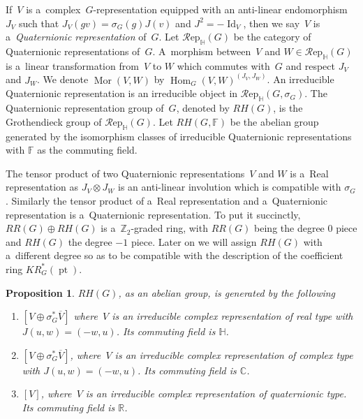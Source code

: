 \documentclass[pdftex]{sigma}
\numberwithin{equation}{section}
\newtheorem{Proposition}[Theorem]{Proposition}
{\theoremstyle{definition}
\newtheorem{Definition}[Theorem]{Definition}
\newtheorem{Example}[Theorem]{Example}
\newtheorem{Remark}[Theorem]{Remark}
}
\DeclareMathOperator{\pt}{pt}
\DeclareMathOperator{\Mor}{Mor}
\DeclareMathOperator{\Hom}{Hom}
\DeclareMathOperator{\Id}{Id}
\begin{document}
\begin{Definition}
If~$V$ is a~complex~$G$-representation equipped with an anti-linear endomor\-phism~$J_V$ such that $J_V(gv)=
\sigma_G(g)J(v)$ and $J^2=-\Id
_V$, then we say~$V$ is a~\emph{Quaternionic representation} of~$G$.
Let $\mathcal{R}\text{ep}_\mathbb{H}(G)$ be the category of Quaternionic representations of~$G$.
A~morphism between~$V$ and $W\in \mathcal{R}\text{ep}_\mathbb{H}(G)$ is a~linear transformation from~$V$ to $W$ which commutes
with~$G$ and respect $J_V$ and $J_W$.
We denote $\Mor(V, W)$ by $\Hom_G(V, W)^{(J_V, J_W)}$.
An irreducible Quaternionic representation is an irreducible object in $\mathcal{R}\text{ep}_\mathbb{H}(G,
\sigma_G)$.
The Quaternionic representation group of~$G$, denoted by $RH(G)$, is the Grothendieck group of $\mathcal{R}\text{ep}_\mathbb{H}(G)$.
Let $RH(G, \mathbb{F})$ be the abelian group generated by the isomorphism classes of irreducible Quaternionic
representations with $\mathbb{F}$ as the commuting f\/ield.
\end{Definition}
\begin{Remark}
The tensor product of two Quaternionic representations~$V$ and $W$ is a~Real representation as $J_V\otimes J_W$ is an
anti-linear involution which is compatible with $\sigma_G$.
Similarly the tensor product of a~Real representation and a~Quaternionic representation is a~Quaternionic
representation.
To put it succinctly, $RR(G)\oplus RH(G)$ is a~$\mathbb{Z}
_2$-graded ring, with $RR(G)$ being the degree $0$ piece and $RH(G)$ the degree $-1$ piece.
Later on we will assign $RH(G)$ with a~dif\/ferent degree so as to be compatible with the description of the coef\/f\/icient
ring $KR^*_G(\pt)$.
\end{Remark}
\begin{Proposition}
\label{quatrepclassification}
$RH(G)$, as an abelian group, is generated by the following
\begin{enumerate}\itemsep=0pt
\item[$1.$]
$[V\oplus
\sigma_G^*\overline{V}]$ where~$V$ is an irreducible complex representation of real type with $J(u, w)=(-w, u)$.
Its commuting field is $\mathbb{H}$.
\item[$2.$]
$[V\oplus\sigma_G^*\overline{V}]$, where~$V$ is an irreducible complex representation of complex type with $J(u, w)=(-w, u)$.
Its commuting field is $\mathbb{C}$.
\item[$3.$]
$[V]$, where~$V$ is an irreducible complex representation of quaternionic type.
Its commuting field is $\mathbb{R}$.
\end{enumerate}
\end{Proposition}
\end{document}
